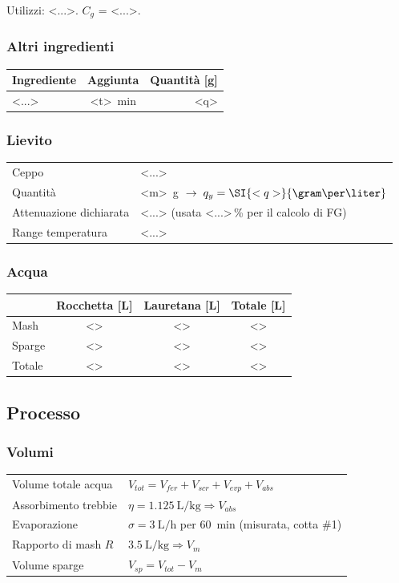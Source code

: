 \noindent Utilizzi: <...>. $C_g$ = <...>.

\subsubsection*{Altri ingredienti}
\begin{tabularx}{\linewidth}{@{}Xcr@{}}
\toprule
Ingrediente & Aggiunta & Quantità [\si{\gram}] \\
\midrule
<...> & \SI{<t>}{\minute} & <q> \\
\bottomrule
\end{tabularx}

\subsubsection*{Lievito}
\begin{tabularx}{\linewidth}{@{}lX@{}}
\toprule
Ceppo & <...> \\
Quantità & \SI{<m>}{\gram} $\;\to\; q_y = \SI{<q>}{\gram\per\liter}$ \\
Attenuazione dichiarata & <...> (usata <...>\,\% per il calcolo di FG) \\
Range temperatura & <...> \\
\bottomrule
\end{tabularx}

\subsubsection*{Acqua}
\begin{tabularx}{\linewidth}{@{}lccc@{}}
\toprule
 & Rocchetta [\si{\liter}] & Lauretana [\si{\liter}] & Totale [\si{\liter}] \\
\midrule
Mash   & <> & <> & <> \\
Sparge & <> & <> & <> \\
\midrule
Totale & <> & <> & <> \\
\bottomrule
\end{tabularx}

\subsection*{Processo}

\subsubsection*{Volumi}
\begin{tabularx}{\linewidth}{@{}lX@{}}
\toprule
Volume totale acqua & $V_{tot} = V_{fer} + V_{scr} + V_{evp} + V_{abs}$ \\
Assorbimento trebbie & $\eta = \SI{1,125}{\liter\per\kilo\gram} \Rightarrow V_{abs}$ \\
Evaporazione & $\sigma = \SI{3}{\liter\per\hour}$ per \SI{60}{\minute} (misurata, cotta \#1) \\
Rapporto di mash $R$ & $\SI{3,5}{\liter\per\kilo\gram} \Rightarrow V_m$ \\
Volume sparge & $V_{sp} = V_{tot} - V_m$ \\
\bottomrule
\end{tabularx}

